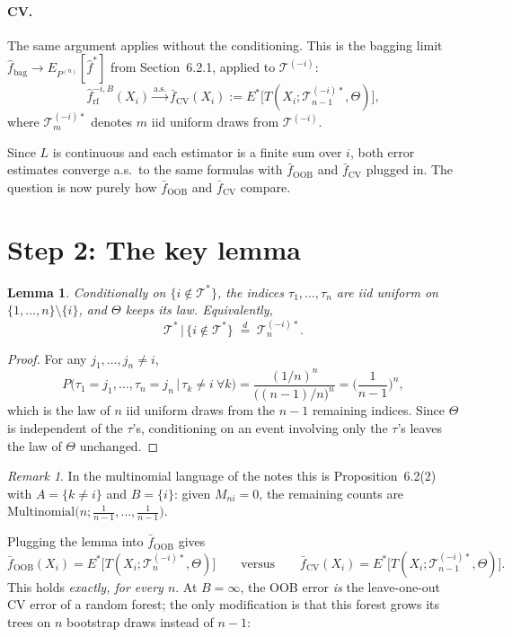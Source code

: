 \documentclass[11pt,a4paper]{article}
\newtheorem{lemma}{Lemma}
\theoremstyle{remark}
\newtheorem*{remark}{Remark}
\newcommand{\cT}{\mathcal T}
\newcommand{\1}{\mathbf 1}
\newcommand{\fOOB}{\bar f_{\mathrm{OOB}}}
\newcommand{\fCV}{\bar f_{\mathrm{CV}}}
\newcommand{\Tmi}[1]{\cT^{(-i)*}_{#1}}
\begin{document}
\paragraph{CV.} The same argument applies without the conditioning. This is the bagging limit $\hat f_{\mathrm{bag}}\to E_{P^{(n)}}[\hat f^*]$ from Section~6.2.1, applied to $\cT^{(-i)}$:
\[
\hat f^{-i,B}_{\mathrm{rf}}(X_i)\xrightarrow{\text{a.s.}}\fCV(X_i):=E^*\big[T(X_i;\Tmi{n-1},\Theta)\big],
\]
where $\Tmi{m}$ denotes $m$ iid uniform draws from $\cT^{(-i)}$.

Since $L$ is continuous and each estimator is a finite sum over $i$, both error estimates converge a.s.\ to the same formulas with $\fOOB$ and $\fCV$ plugged in. The question is now purely how $\fOOB$ and $\fCV$ compare.

\section*{Step 2: The key lemma}

\begin{lemma}
Conditionally on $\{i\notin\cT^*\}$, the indices $\tau_1,\dots,\tau_n$ are iid uniform on $\{1,\dots,n\}\setminus\{i\}$, and $\Theta$ keeps its law. Equivalently,
\[
\cT^*\,\big|\,\{i\notin\cT^*\}\;\overset{d}{=}\;\Tmi{n}.
\]
\end{lemma}

\begin{proof}
For any $j_1,\dots,j_n\neq i$,
\[
P\big(\tau_1=j_1,\dots,\tau_n=j_n\,\big|\,\tau_k\neq i\ \forall k\big)
=\frac{(1/n)^n}{\big((n-1)/n\big)^n}=\Big(\frac{1}{n-1}\Big)^n,
\]
which is the law of $n$ iid uniform draws from the $n-1$ remaining indices. Since $\Theta$ is independent of the $\tau$'s, conditioning on an event involving only the $\tau$'s leaves the law of $\Theta$ unchanged.
\end{proof}

\begin{remark}
In the multinomial language of the notes this is Proposition~6.2(2) with $A=\{k\neq i\}$ and $B=\{i\}$: given $M_{ni}=0$, the remaining counts are $\mathrm{Multinomial}\big(n;\tfrac1{n-1},\dots,\tfrac1{n-1}\big)$.
\end{remark}

Plugging the lemma into $\fOOB$ gives
\[
\fOOB(X_i)=E^*\big[T(X_i;\Tmi{n},\Theta)\big]
\qquad\text{versus}\qquad
\fCV(X_i)=E^*\big[T(X_i;\Tmi{n-1},\Theta)\big].
\]
This holds \emph{exactly, for every $n$}. At $B=\infty$, the OOB error \emph{is} the leave-one-out CV error of a random forest; the only modification is that this forest grows its trees on $n$ bootstrap draws instead of $n-1$:
\end{document}
